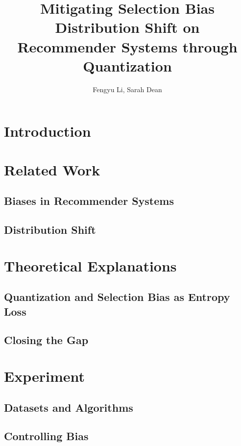 \documentclass[12pt, letterpaper]{article}
\title{\vspace{-2.0cm}Mitigating Selection Bias Distribution Shift on Recommender Systems through Quantization }
\author{Fengyu Li, Sarah Dean}
\date{}
\theoremstyle{definition}\newtheorem*{definition}{Definition}
\theoremstyle{definition}\newtheorem*{example}{Example}
\theoremstyle{definition}\newtheorem*{remark}{Remark}
\begin{document}
\maketitle

\begin{abstract}

\end{abstract}

\section{Introduction}

\section{Related Work}

\subsection{Biases in Recommender Systems}

\subsection{Distribution Shift}

\section{Theoretical Explanations}

\subsection{Quantization and Selection Bias as Entropy Loss}

\subsection{Closing the Gap}

\section{Experiment}

\subsection{Datasets and Algorithms}

\subsection{Controlling Bias}
\end{document}
